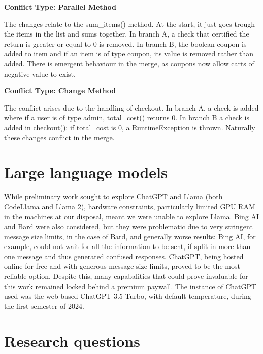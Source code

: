 \textbf{Conflict Type: Parallel Method}

The changes relate to the sum\_items() method. At the start, it just goes trough the items in the list and sums together. In branch A,
a check that certified the return is greater or equal to 0 is removed. In branch B, the boolean coupon is added to item and if an item
is of type coupon, its value is removed rather than added. There is emergent behaviour in the merge, as coupons now allow carts of negative
value to exist.

\textbf{Conflict Type: Change Method}

The conflict arises due to the handling of checkout. In branch A, a check is added where if a user is of type admin,
total\_cost() returns 0. In branch B a check is added in checkout(): if total\_cost is 0, a RuntimeException is thrown.
Naturally these changes conflict in the merge.



\section{Large language models}


While preliminary work sought to explore ChatGPT and Llama (both CodeLlama and Llama 2), hardware constraints, particularly limited GPU RAM in the machines at our disposal, meant we were unable to explore Llama.  Bing AI and Bard were also considered, but they were problematic due to very stringent message size limits, in the case of Bard, and generally worse results: Bing AI, for example, could not wait for all the information to be sent, if split in more than one message and thus generated confused responses. ChatGPT, being hosted online for free and with generous message size limits, proved to be the most reliable option. Despite this, many capabalities that could prove invaluable for this work remained locked behind a premium paywall.
The instance of ChatGPT used was the web-based ChatGPT 3.5 Turbo, with default temperature, during the first semester of 2024.

\section{Research questions}

